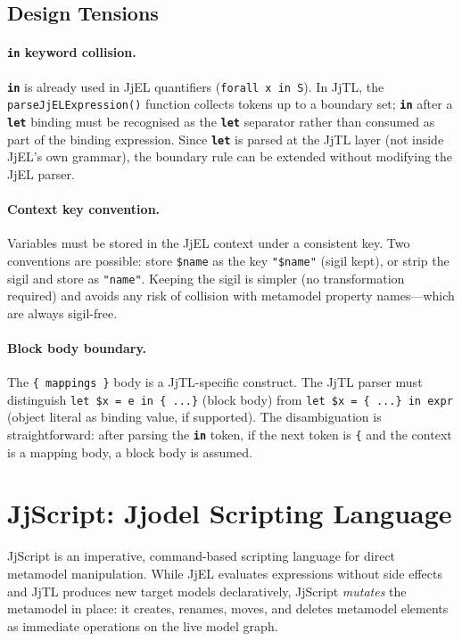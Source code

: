 \documentclass[11pt,a4paper]{article}
\newcommand{\jjscript}{\textsf{JjScript}}
\newcommand{\jjel}{\textsf{JjEL}}
\newcommand{\jjtl}{\textsf{JjTL}}
\newcommand{\kw}[1]{\texttt{\textbf{#1}}}
\begin{document}
\subsection{Design Tensions}

\paragraph{\kw{in} keyword collision.}
\kw{in} is already used in \jjel{} quantifiers (\texttt{forall x in S}).
In \jjtl{}, the \texttt{parseJjELExpression()} function collects tokens
up to a boundary set; \kw{in} after a \kw{let} binding must be
recognised as the \kw{let} separator rather than consumed as part of the
binding expression. Since \kw{let} is parsed at the \jjtl{} layer (not
inside \jjel{}'s own grammar), the boundary rule can be extended without
modifying the \jjel{} parser.

\paragraph{Context key convention.}
Variables must be stored in the \jjel{} context under a consistent key.
Two conventions are possible: store \texttt{\$name} as the key
\texttt{"\$name"} (sigil kept), or strip the sigil and store as
\texttt{"name"}. Keeping the sigil is simpler (no transformation
required) and avoids any risk of collision with metamodel property
names---which are always sigil-free.

\paragraph{Block body boundary.}
The \texttt{\{~mappings~\}} body is a \jjtl{}-specific construct. The
\jjtl{} parser must distinguish \texttt{let \$x = e in \{~...\}} (block
body) from \texttt{let \$x = \{~...\} in expr} (object literal as
binding value, if supported). The disambiguation is straightforward:
after parsing the \kw{in} token, if the next token is \texttt{\{} and
the context is a mapping body, a block body is assumed.


\section{JjScript: Jjodel Scripting Language}\label{sec:jjscript}

\jjscript{} is an imperative, command-based scripting language for direct
metamodel manipulation. While \jjel{} evaluates expressions without side
effects and \jjtl{} produces new target models declaratively, \jjscript{}
\emph{mutates} the metamodel in place: it creates, renames, moves, and
deletes metamodel elements as immediate operations on the live model graph.
\end{document}
